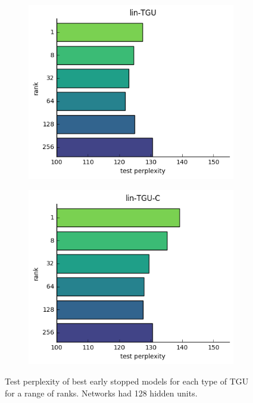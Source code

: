 \begin{figure}
\begin{subfigure}[t]{0.45\textwidth}
	\includegraphics[width=\textwidth]{exps/ptb/lintgu-rank}
\end{subfigure}
\begin{subfigure}[t]{0.45\textwidth}
	\includegraphics[width=\textwidth]{exps/ptb/lintguc-rank}
\end{subfigure}

\caption[TGU PTB results by rank]{Test perplexity
 of best early stopped models for
each type of TGU for a range of ranks. Networks had 128 hidden units.}
\label{fig:ptbtgurank}
\end{figure}


